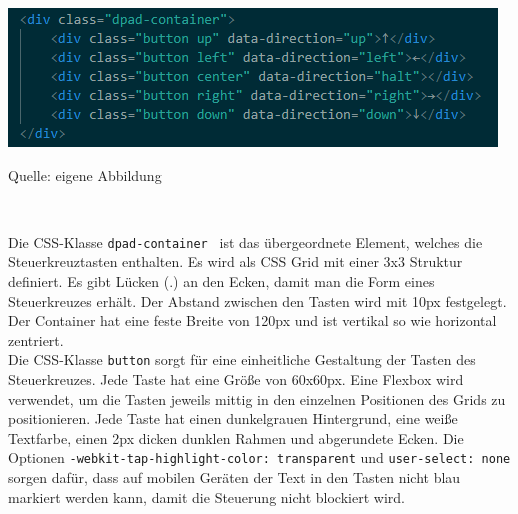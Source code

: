 \documentclass[ngerman,12pt,a4paper]{article}
\begin{document}
	\begin{center}
		\begin{minipage}[t]{0.65\textwidth}
			\includegraphics[scale=0.8]{Pictures/Steuerung-html}
			\label{fig:Steuerkreuz-html}
			\vspace{-10pt}
			\begin{center}
				\par\small Quelle: eigene Abbildung 
			\end{center}
		\end{minipage} \\[0.75cm]
	\end{center}
	Die CSS-Klasse \texttt{dpad-container } ist das übergeordnete Element, welches die Steuerkreuztasten enthalten. Es wird als CSS Grid mit einer 3x3 Struktur definiert. Es gibt Lücken (.) an den Ecken, damit man die Form eines Steuerkreuzes erhält. Der Abstand zwischen den Tasten wird mit 10px festgelegt. Der Container hat eine feste Breite von 120px und ist vertikal so wie horizontal zentriert. \\[0.5cm]
	Die CSS-Klasse \texttt{button} sorgt für eine einheitliche Gestaltung der Tasten des Steuerkreuzes. Jede Taste hat eine Größe von 60x60px. Eine Flexbox wird verwendet, um die Tasten jeweils mittig in den einzelnen Positionen des Grids zu positionieren. Jede Taste hat einen dunkelgrauen Hintergrund, eine weiße Textfarbe, einen 2px dicken dunklen Rahmen und abgerundete Ecken. Die Optionen \texttt{-webkit-tap-highlight-color: transparent} und \texttt{user-select: none} sorgen dafür, dass auf mobilen Geräten der Text in den Tasten nicht blau markiert werden kann, damit die Steuerung nicht blockiert wird. 
\end{document}
